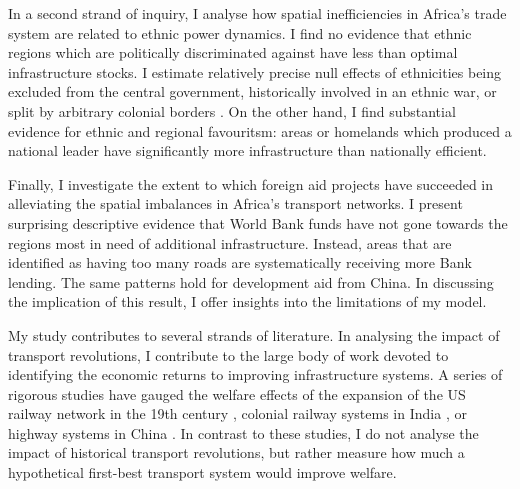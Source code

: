 \documentclass[11pt, oneside]{article}   	%
\begin{document}
In a second strand of inquiry, I analyse how spatial inefficiencies in Africa's trade system are related to ethnic power dynamics. I find no evidence that ethnic regions which are politically discriminated against have less than optimal infrastructure stocks. I estimate relatively precise null effects of ethnicities being excluded from the central government, historically involved in an ethnic war, or split by arbitrary colonial borders \citep{michalopoulos_long-run_2016}. On the other hand, I find substantial evidence for ethnic and regional favouritsm: areas or homelands which produced a national leader have significantly more infrastructure than nationally efficient.

Finally, I investigate the extent to which foreign aid projects have succeeded in alleviating the spatial imbalances in Africa's transport networks. I present surprising descriptive evidence that World Bank funds have not gone towards the regions most in need of additional infrastructure. Instead, areas that are identified as having too many roads are systematically receiving more Bank lending. The same patterns hold for development aid from China. In discussing the implication of this result, I offer insights into the limitations of my model.

My study contributes to several strands of literature. In analysing the impact of transport revolutions, I contribute to the large body of work devoted to identifying the economic returns to improving infrastructure systems. A series of rigorous studies have gauged the welfare effects of the expansion of the US railway network in the 19th century \citep{donaldson_railroads_2016,swisher_reassessing_2017}, colonial railway systems in India \citep{Donaldson_RailroadsRajEstimating_2018,burgess_railroads_2012}, or highway systems in China \citep{faber_trade_2014,baum-snow_roads_2017}. In contrast to these studies, I do not analyse the impact of historical transport revolutions, but rather measure how much a hypothetical first-best transport system would improve welfare.
\end{document}
